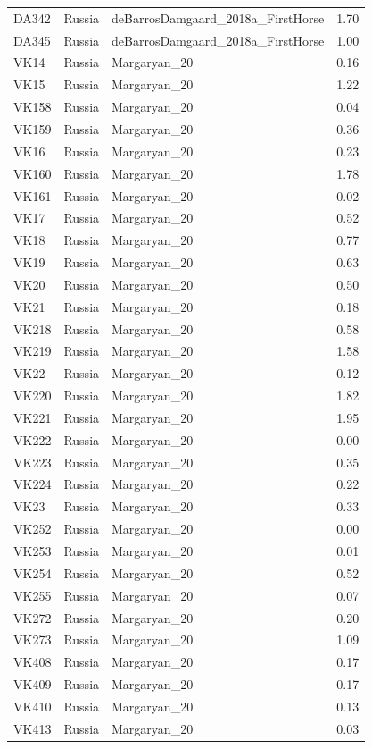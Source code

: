 \begin{longtable}[t]{lllr}
DA342 & Russia & deBarrosDamgaard\_2018a\_FirstHorse & 1.70\\
DA345 & Russia & deBarrosDamgaard\_2018a\_FirstHorse & 1.00\\
VK14 & Russia & Margaryan\_20 & 0.16\\
VK15 & Russia & Margaryan\_20 & 1.22\\
VK158 & Russia & Margaryan\_20 & 0.04\\
VK159 & Russia & Margaryan\_20 & 0.36\\
VK16 & Russia & Margaryan\_20 & 0.23\\
VK160 & Russia & Margaryan\_20 & 1.78\\
VK161 & Russia & Margaryan\_20 & 0.02\\
VK17 & Russia & Margaryan\_20 & 0.52\\
VK18 & Russia & Margaryan\_20 & 0.77\\
VK19 & Russia & Margaryan\_20 & 0.63\\
VK20 & Russia & Margaryan\_20 & 0.50\\
VK21 & Russia & Margaryan\_20 & 0.18\\
VK218 & Russia & Margaryan\_20 & 0.58\\
VK219 & Russia & Margaryan\_20 & 1.58\\
VK22 & Russia & Margaryan\_20 & 0.12\\
VK220 & Russia & Margaryan\_20 & 1.82\\
VK221 & Russia & Margaryan\_20 & 1.95\\
VK222 & Russia & Margaryan\_20 & 0.00\\
VK223 & Russia & Margaryan\_20 & 0.35\\
VK224 & Russia & Margaryan\_20 & 0.22\\
VK23 & Russia & Margaryan\_20 & 0.33\\
VK252 & Russia & Margaryan\_20 & 0.00\\
VK253 & Russia & Margaryan\_20 & 0.01\\
VK254 & Russia & Margaryan\_20 & 0.52\\
VK255 & Russia & Margaryan\_20 & 0.07\\
VK272 & Russia & Margaryan\_20 & 0.20\\
VK273 & Russia & Margaryan\_20 & 1.09\\
VK408 & Russia & Margaryan\_20 & 0.17\\
VK409 & Russia & Margaryan\_20 & 0.17\\
VK410 & Russia & Margaryan\_20 & 0.13\\
VK413 & Russia & Margaryan\_20 & 0.03\\

\end{longtable}
